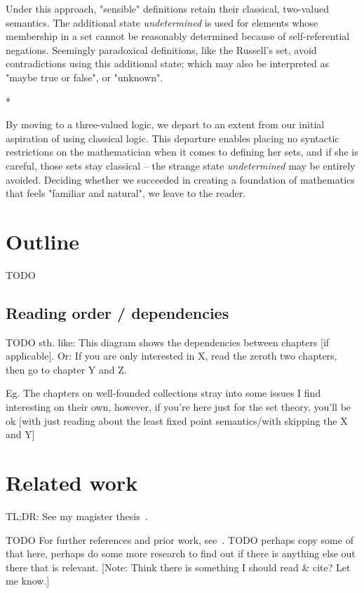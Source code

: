 \documentclass[oneside,12pt]{book}
\theoremstyle{definition}
\theoremstyle{remark}
\newcommand{\sectionStars}{
\bigskip
*\quad*\quad*
\medskip
}
\begin{document}
Under this approach, "sensible" definitions retain their classical, two-valued
semantics. The additional state \textit{undetermined} is used for
elements whose membership in a set cannot be reasonably determined
because of self-referential negations. Seemingly paradoxical definitions, like
the Russell's set, avoid contradictions using this additional
state; which may also be interpreted as "maybe true or false", or "unknown".

\sectionStars


\noindent By moving to a three-valued logic, we depart to an extent from our
initial aspiration of using classical logic. This departure enables placing no
syntactic restrictions on the mathematician when it comes to defining her sets,
and if she is careful, those sets stay classical -- the strange state
\textit{undetermined} may be entirely avoided.
Deciding whether we succeeded in creating a foundation of mathematics that
feels "familiar and natural", we leave to the reader.


\section{Outline}
TODO

\subsection{Reading order / dependencies}
TODO sth. like: This diagram shows the dependencies between chapters
[if applicable]. Or: If you are only interested in X, read the zeroth two
chapters, then go to chapter Y and Z.

Eg. The chapters on well-founded collections stray into some issues I find interesting
on their own, however, if you're here just for the set theory, you'll be ok
[with just reading about the least fixed point semantics/with skipping the X and Y]

\section{Related work}
TL;DR: See my magister thesis~\cite{MikusinecMgrThesis}.

TODO For further references and prior work, see~\cite{MikusinecMgrThesis}.
TODO perhaps copy some of that here, perhaps do some more research to find out
if there is anything else out there that is relevant. [Note: Think there is
something I should read & cite? Let me know.]
\end{document}
